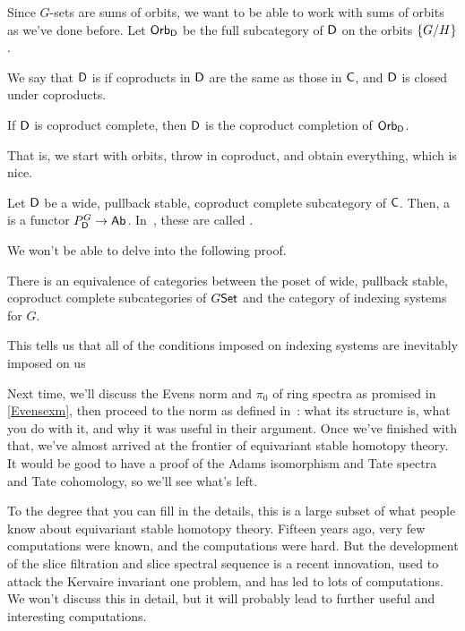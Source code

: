 Since $G$-sets are sums of orbits, we want to be able to work with sums of orbits as we've done before. Let
$\mathsf{Orb}_\mathsf D$ be the full subcategory of $\mathsf D$ on the orbits $\{G/H\}$.
\begin{defn}
We say that $\mathsf D$ is  if coproducts in $\mathsf D$ are the same as those in $\mathsf C$, and $\mathsf D$ is
closed under coproducts.
\end{defn}
\begin{lem}
If $\mathsf D$ is coproduct complete, then $\mathsf D$ is the coproduct completion of $\mathsf{Orb}_\mathsf D$.
\end{lem}
That is, we start with orbits, throw in coproduct, and obtain everything, which is nice.
\begin{defn}
Let $\mathsf D$ be a wide, pullback stable, coproduct complete subcategory of $\mathsf C$. Then, a 
is a functor $P_\mathsf D^G\to\mathsf{Ab}$. In~\cite{BlumbergHill}, these are called .
\end{defn}
We won't be able to delve into the following proof.
\begin{thm}
There is an equivalence of categories between the poset of wide, pullback stable, coproduct complete subcategories
of $G\mathsf{Set}$ and the category of indexing systems for $G$.
\end{thm}
This tells us that all of the conditions imposed on indexing systems are inevitably imposed on us 

Next time, we'll discuss the Evens norm and $\pi_0$ of ring spectra as promised in \cref{Evensexm}, then proceed to
the norm as defined in~\cite{HHR}: what its structure is, what you do with it, and why it was useful in their
argument. Once we've finished with that, we've almost arrived at the frontier of equivariant stable homotopy
theory. It would be good to have a proof of the Adams isomorphism and Tate spectra and Tate cohomology, so we'll
see what's left.

To the degree that you can fill in the details, this is a large subset of what people know about equivariant stable
homotopy theory. Fifteen years ago, very few computations were known, and the computations were hard. But the
development of the slice filtration and slice spectral sequence is a recent innovation, used to attack the Kervaire
invariant one problem, and has led to lots of computations. We won't discuss this in detail, but it will probably
lead to further useful and interesting computations.

